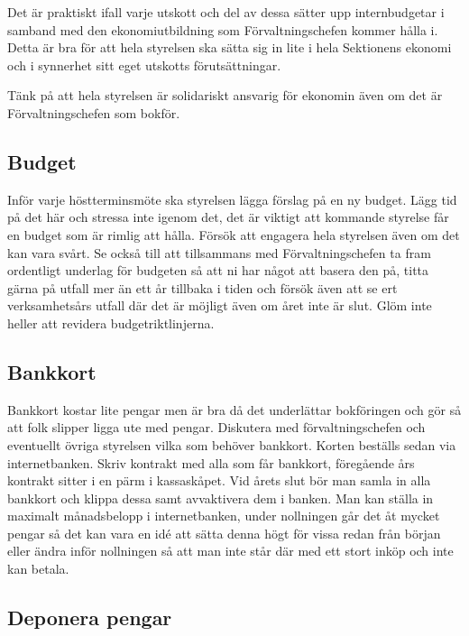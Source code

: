 \documentclass[10pt]{article}
\begin{document}
    Det är praktiskt ifall varje utskott och del av dessa sätter upp internbudgetar i samband med den ekonomiutbildning som Förvaltningschefen kommer hålla i. Detta är bra för att hela styrelsen ska sätta sig in lite i hela Sektionens ekonomi och i synnerhet sitt eget utskotts förutsättningar.
    
    Tänk på att hela styrelsen är solidariskt ansvarig för ekonomin även om det är Förvaltningschefen som bokför.
    
    \subsection{Budget}
    
    Inför varje höstterminsmöte ska styrelsen lägga förslag på en ny budget. Lägg tid på det här och stressa inte igenom det, det är viktigt att kommande styrelse får en budget som är rimlig att hålla. Försök att engagera hela styrelsen även om det kan vara svårt. Se också till att tillsammans med Förvaltningschefen ta fram ordentligt underlag för budgeten så att ni har något att basera den på, titta gärna på utfall mer än ett år tillbaka i tiden och försök även att se ert verksamhetsårs utfall där det är möjligt även om året inte är slut. Glöm inte heller att revidera budgetriktlinjerna.
    
    \subsection{Bankkort}
    
    Bankkort kostar lite pengar men är bra då det underlättar bokföringen och gör så att folk slipper ligga ute med pengar. Diskutera med förvaltningschefen och eventuellt övriga styrelsen vilka som behöver bankkort. Korten beställs sedan via internetbanken. Skriv kontrakt med alla som får bankkort, föregående års kontrakt sitter i en pärm i kassaskåpet. Vid årets slut bör man samla in alla bankkort och klippa dessa samt avvaktivera dem i banken. Man kan ställa in maximalt månadsbelopp i internetbanken, under nollningen går det åt mycket pengar så det kan vara en idé att sätta denna högt för vissa redan från början eller ändra inför nollningen så att man inte står där med ett stort inköp och inte kan betala.
    
    \subsection{Deponera pengar}
    
\end{document}
